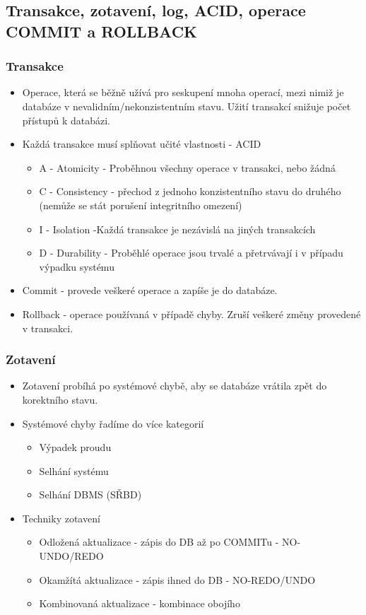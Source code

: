 \documentclass[10pt,a4paper]{article}
\begin{document}
\subsection{Transakce, zotavení, log, ACID, operace COMMIT a ROLLBACK}
\subsubsection{Transakce}
\begin{itemize}
\item Operace, která se běžně užívá pro seskupení mnoha operací, mezi nimiž je databáze v nevalidním/nekonzistentním stavu. Užití transakcí snižuje počet přístupů k databázi.
\item Každá transakce musí splňovat učité vlastnosti - ACID

\begin{itemize}
\item A - Atomicity - Proběhnou všechny operace v transakci, nebo žádná
\item C - Consistency - přechod z jednoho konzistentního stavu do druhého (nemůže se stát porušení integritního omezení)
\item I - Isolation -Každá transakce je nezávislá na jiných transakcích
\item D - Durability - Proběhlé operace jsou trvalé a přetrvávají i v případu výpadku systému
\end{itemize}
\item Commit - provede veškeré operace a zapíše je do databáze.
\item Rollback - operace používaná v případě chyby. Zruší veškeré změny provedené v transakci.
\end{itemize}
\subsubsection{Zotavení}
\begin{itemize}
\item Zotavení probíhá po systémové chybě, aby se databáze vrátila zpět do korektního stavu.
\item Systémové chyby řadíme do více kategorií
\begin{itemize}
\item Výpadek proudu
\item Selhání systému
\item Selhání DBMS (SŘBD)
\end{itemize}
\item Techniky zotavení
\begin{itemize}
\item Odložená aktualizace - zápis do DB až po COMMITu - NO-UNDO/REDO
\item Okamžítá aktualizace - zápis ihned do DB - NO-REDO/UNDO
\item Kombinovaná aktualizace - kombinace obojího
\end{itemize}
\end{itemize}
\end{document}
